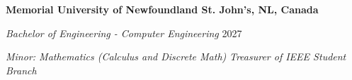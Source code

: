 \textbf{Memorial University of Newfoundland \hfill St. John's, NL, Canada} \par
\textit{Bachelor of Engineering - Computer Engineering} \hfill 2027\par
\textit{Minor: Mathematics (Calculus and Discrete Math)}
\textit{Treasurer of IEEE Student Branch}